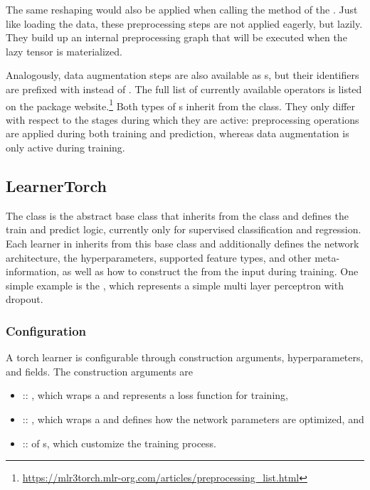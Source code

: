 \documentclass[article]{jss}
\theoremstyle{definition}
\begin{document}
The same reshaping would also be applied when calling the  method of the .
Just like loading the data, these preprocessing steps are not applied eagerly, but lazily.
They build up an internal preprocessing graph that will be executed when the lazy tensor is materialized.

Analogously, data augmentation steps are also available as s, but their identifiers are prefixed with  instead of .
The full list of currently available operators is listed on the package website.\footnote{\url{https://mlr3torch.mlr-org.com/articles/preprocessing\_list.html}}
Both types of s inherit from the  class.
They only differ with respect to the stages during which they are active: preprocessing operations are applied during both training and prediction, whereas data augmentation is only active during training.


\subsection{LearnerTorch}

The   class is the abstract base class that inherits from the  class and defines the train and predict logic, currently only for supervised classification and regression.
Each learner in  inherits from this base class and additionally defines the network architecture, the hyperparameters, supported feature types, and other meta-information, as well as how to construct the  from the input  during training.
One simple example is the , which represents a simple multi layer perceptron with dropout.

\subsubsection{Configuration}

A torch learner is configurable through construction arguments, hyperparameters, and fields.
The construction arguments are

\begin{itemize}
    \item {} :: , which wraps a  and represents a loss function for training,
    \item {} :: , which wraps a  and defines how the network parameters are optimized, and
    \item {} ::  of s, which customize the training process.
\end{itemize}
\end{document}

